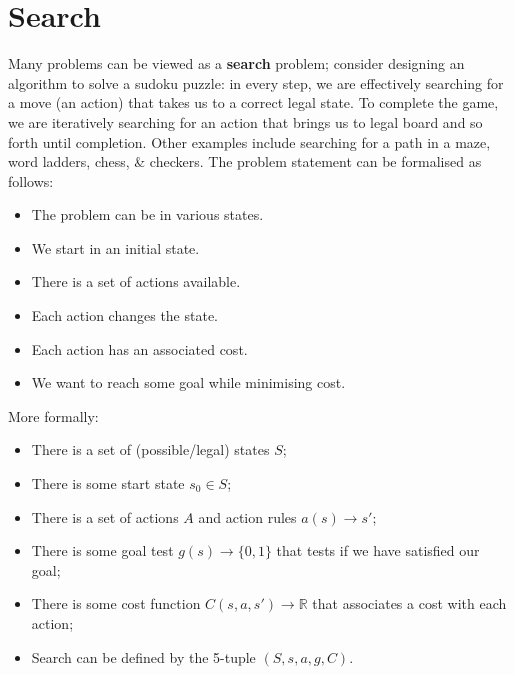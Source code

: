 \documentclass[a4paper,11pt]{article}
\begin{document}
\section{Search}
Many problems can be viewed as a \textbf{search} problem;
consider designing an algorithm to solve a sudoku puzzle: in every step, we are effectively searching for a move (an action) that takes us to a correct legal state.
To complete the game, we are iteratively searching for an action that brings us to legal board and so forth until completion.
Other examples include searching for a path in a maze, word ladders, chess, \& checkers.
The problem statement can be formalised as follows:
\begin{itemize}
    \item   The problem can be in various states.
    \item   We start in an initial state.
    \item   There is a set of actions available.
    \item   Each action changes the state.
    \item   Each action has an associated cost.
    \item   We want to reach some goal while minimising cost.
\end{itemize}

More formally:
\begin{itemize}
    \item   There is a set of (possible/legal) states $S$;
    \item   There is some start state $s_0 \in S$;
    \item   There is a set of actions $A$ and action rules $a(s) \rightarrow s'$;
    \item   There is some goal test $g(s) \rightarrow \{0,1\}$ that tests if we have satisfied our goal;
    \item   There is some cost function $C(s,a,s') \rightarrow \mathbb{R}$ that associates a cost with each action;
    \item   Search can be defined by the 5-tuple $(S,s,a,g,C)$.
\end{itemize}
\end{document}
